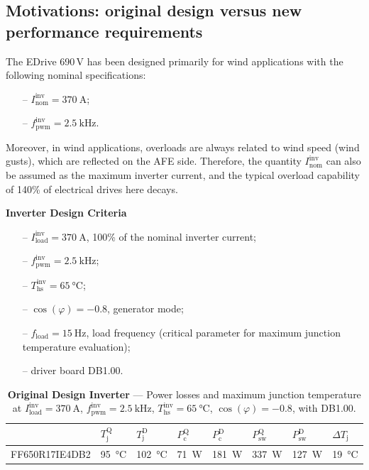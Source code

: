 \documentclass[12pt,a4paper,oneside]{book}
\begin{document}
	\begin{onehalfspace}
		\section{Motivations: original design versus new performance requirements}
		The EDrive 690\,V has been designed primarily for wind applications with the following
		nominal specifications:
		\begin{itemize}
			\item[--] $I_\text{nom}^\text{inv} = \SI{370}{\ampere}$;
			\item[--] $f_\text{pwm}^\text{inv} = \SI{2.5}{\kilo\hertz}$.
		\end{itemize}
		Moreover, in wind applications, overloads are always related to wind speed (wind gusts), which are
		reflected on the AFE side. Therefore, the quantity $I_\text{nom}^\text{inv}$ can also be
		assumed as the maximum inverter current, and the typical overload capability of 140\% of electrical drives here decays.
		
		\vspace{5mm}
		\noindent\textbf{Inverter Design Criteria}
		\begin{itemize}
			\item[--] $I_\text{load}^\text{inv} = \SI{370}{\ampere}$, 100\% of the nominal inverter current;
			\item[--] $f_\text{pwm}^\text{inv} = \SI{2.5}{\kilo\hertz}$;
			\item[--] $T_\text{hs}^\text{inv} = \SI{65}{\celsius}$;
			\item[--] $\cos(\varphi) = -0.8$, generator mode;
			\item[--] $f_\text{load} = \SI{15}{\hertz}$, load frequency (critical parameter for maximum junction temperature evaluation);
			\item[--] driver board DB1.00.
		\end{itemize}
		\begin{table}[H]
			\centering
			\captionsetup{width=0.75\textwidth, font=small}
			\caption{\textbf{Original Design Inverter} --- Power losses and maximum junction temperature at $I_\text{load}^\text{inv} = \SI{370}{\ampere}$, $f_\text{pwm}^\text{inv} = \SI{2.5}{\kilo\hertz}$, $T_\text{hs}^\text{inv} = \SI{65}{\celsius}$, $\cos(\varphi) = -0.8$, with DB1.00.}
			\label{}
			\renewcommand{\arraystretch}{2.0}
			\begin{tabularx}{\textwidth}{Y|Z|Z|Z|Z|Z|Z|Z}
				\hline\hline
				& $T_\text{j}^\text{Q}$ & $T_\text{j}^\text{D}$ & $P_\text{c}^\text{Q}$ & $P_\text{c}^\text{D}$ & $P_\text{sw}^\text{Q}$ & $P_\text{sw}^\text{D}$ & $\Delta T_\text{j}$ \\
				\hline
				FF650R17IE4DB2 & \SI{95}{\celsius} & \SI{102}{\celsius}  & \SI{71}{\watt} & \SI{181}{\watt}  & \SI{337}{\watt}  & \SI{127}{\watt} & \SI{19}{\celsius} \\
				\hline\hline
			\end{tabularx}
		\end{table}
		

\end{onehalfspace}
\end{document}
